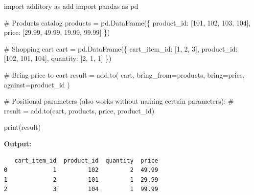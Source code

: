 \documentclass[
  letterpaper,
]{scrbook}
\newenvironment{Shaded}{\begin{snugshade}}{\end{snugshade}}
\newcommand{\BuiltInTok}[1]{\textcolor[rgb]{0.00,0.23,0.31}{#1}}
\newcommand{\CommentTok}[1]{\textcolor[rgb]{0.37,0.37,0.37}{#1}}
\newcommand{\DecValTok}[1]{\textcolor[rgb]{0.68,0.00,0.00}{#1}}
\newcommand{\FloatTok}[1]{\textcolor[rgb]{0.68,0.00,0.00}{#1}}
\newcommand{\ImportTok}[1]{\textcolor[rgb]{0.00,0.46,0.62}{#1}}
\newcommand{\NormalTok}[1]{\textcolor[rgb]{0.00,0.23,0.31}{#1}}
\newcommand{\OperatorTok}[1]{\textcolor[rgb]{0.37,0.37,0.37}{#1}}
\newcommand{\StringTok}[1]{\textcolor[rgb]{0.13,0.47,0.30}{#1}}
\begin{document}
\begin{Shaded}
\begin{Highlighting}[]
\ImportTok{import}\NormalTok{ additory }\ImportTok{as}\NormalTok{ add}
\ImportTok{import}\NormalTok{ pandas }\ImportTok{as}\NormalTok{ pd}

\CommentTok{\# Products catalog}
\NormalTok{products }\OperatorTok{=}\NormalTok{ pd.DataFrame(\{}
    \StringTok{\textquotesingle{}product\_id\textquotesingle{}}\NormalTok{: [}\DecValTok{101}\NormalTok{, }\DecValTok{102}\NormalTok{, }\DecValTok{103}\NormalTok{, }\DecValTok{104}\NormalTok{],}
    \StringTok{\textquotesingle{}price\textquotesingle{}}\NormalTok{: [}\FloatTok{29.99}\NormalTok{, }\FloatTok{49.99}\NormalTok{, }\FloatTok{19.99}\NormalTok{, }\FloatTok{99.99}\NormalTok{]}
\NormalTok{\})}

\CommentTok{\# Shopping cart}
\NormalTok{cart }\OperatorTok{=}\NormalTok{ pd.DataFrame(\{}
    \StringTok{\textquotesingle{}cart\_item\_id\textquotesingle{}}\NormalTok{: [}\DecValTok{1}\NormalTok{, }\DecValTok{2}\NormalTok{, }\DecValTok{3}\NormalTok{],}
    \StringTok{\textquotesingle{}product\_id\textquotesingle{}}\NormalTok{: [}\DecValTok{102}\NormalTok{, }\DecValTok{101}\NormalTok{, }\DecValTok{104}\NormalTok{],}
    \StringTok{\textquotesingle{}quantity\textquotesingle{}}\NormalTok{: [}\DecValTok{2}\NormalTok{, }\DecValTok{1}\NormalTok{, }\DecValTok{1}\NormalTok{]}
\NormalTok{\})}

\CommentTok{\# Bring price to cart}
\NormalTok{result }\OperatorTok{=}\NormalTok{ add.to(}
\NormalTok{    cart,}
\NormalTok{    bring\_from}\OperatorTok{=}\NormalTok{products,}
\NormalTok{    bring}\OperatorTok{=}\StringTok{\textquotesingle{}price\textquotesingle{}}\NormalTok{,}
\NormalTok{    against}\OperatorTok{=}\StringTok{\textquotesingle{}product\_id\textquotesingle{}}
\NormalTok{)}

\CommentTok{\# Positional parameters (also works without naming certain parameters):}
\CommentTok{\# result = add.to(cart, products, \textquotesingle{}price\textquotesingle{}, \textquotesingle{}product\_id\textquotesingle{})}

\BuiltInTok{print}\NormalTok{(result)}
\end{Highlighting}
\end{Shaded}

\textbf{Output:}

\begin{verbatim}
   cart_item_id  product_id  quantity  price
0             1         102         2  49.99
1             2         101         1  29.99
2             3         104         1  99.99
\end{verbatim}
\end{document}
